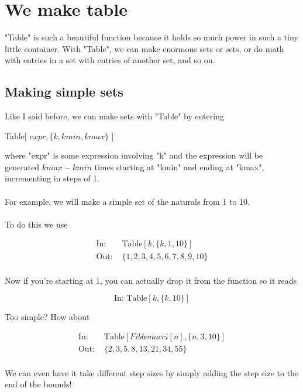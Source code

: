 \documentclass[11pt,a4paper,twoside]{article}
\begin{document}
		\section{We make table}
		
		 	"Table" is such a beautiful function because it holds so much power in such a tiny little container.  With "Table", we can make enormous sets or sets, or do math with entries in a set with entries of another set, and so on.
			
			\subsection{Making simple sets}
				
				Like I said before, we can make sets with "Table" by entering
				
				\begin{center} Table[ $ expr, \{ k,kmin,kmax \} $ ] \end{center}
				
				where "expr" is some expression involving "k" and the expression will be generated $ kmax - kmin $ times starting at "kmin" and ending at "kmax", incrementing in steps of 1.
				\\
				\\
				For example, we will make a simple set of the naturals from 1 to 10.
				\\
				\\
				To do this we use
				
				\begin{align*}
					\text{In: }& \text{Table} [ k , \{ k,1,10 \} ] \\
					\text{Out: }& \{1,2,3,4,5,6,7,8,9,10\} \\
				\end{align*}
				
				Now if you're starting at 1, you can actually drop it from the function so it reads

				\[ \text{In: } \text{Table} [ k , \{ k,10 \} ] \]
				
				Too simple?  How about
				
				\begin{align*}
					\text{In: }& \text{Table} [ Fibbonacci[n] , \{ n,3,10 \} ] \\
					\text{Out: }& \{2,3,5,8,13,21,34,55\} \\
				\end{align*}
				
				We can even have it take different step sizes by simply adding the step size to the end of the bounds!
				
\end{document}
